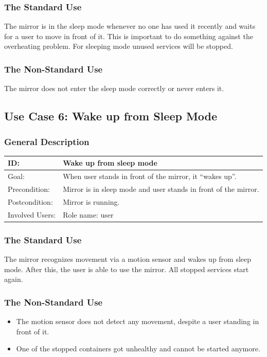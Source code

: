 \documentclass[12pt]{article}
\theoremstyle{definition}
\begin{document}
\subsubsection{The Standard Use}
The mirror is in the sleep mode whenever no one has used it recently and waits for a user to move in front of it. This is important to do something against the overheating problem. For sleeping mode unused services will be stopped.

\subsubsection{The Non-Standard Use}
The mirror does not enter the sleep mode correctly or never enters it.

\subsection{Use Case 6: Wake up from Sleep Mode}
\subsubsection{General Description}

\begin{tabular}{|p{.2\linewidth}|p{.65\linewidth}|}
\hline 
ID: & Wake up from sleep mode\\ \hline
Goal: & When user stands in front of the mirror, it ``wakes up''.\\ \hline
Precondition: & Mirror is in sleep mode and user stands in front of the mirror.\\ \hline
Postcondition: &  Mirror is running. \\ \hline
Involved Users: & Role name: user \\ \hline
\end{tabular}

\subsubsection{The Standard Use}
The mirror recognizes movement via a motion sensor and wakes up from sleep mode. After this, the user is able to use the mirror. All stopped services start again.

\subsubsection{The Non-Standard Use}
\begin{itemize}
    \item The motion sensor does not detect any movement, despite a user standing in front of it.
    \item One of the stopped containers got unhealthy and cannot be started anymore.
\end{itemize}
\end{document}
